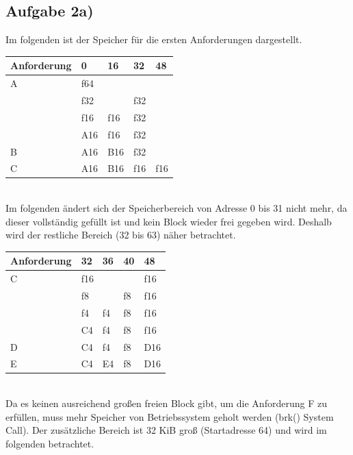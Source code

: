 \documentclass{ti2}
\begin{document}
\subsection*{Aufgabe 2a)}
Im folgenden ist der Speicher für die ersten Anforderungen dargestellt. \\
\begin{table}[htbp]
\begin{adjustbox}{max width=\textwidth}
\begin{tabular}{|l|l|l|l|l|}
\hline
Anforderung & 0 & 16 & 32 & 48 \\ \hline
A  & \multicolumn{ 4}{l|}{f64} \\ \hline
 & \multicolumn{ 2}{l|}{f32} & \multicolumn{ 2}{l|}{f32} \\ \hline
 & f16 & f16 & \multicolumn{ 2}{l|}{f32} \\ \hline
 & A16 & f16 & \multicolumn{ 2}{l|}{f32} \\ \hline
B & A16 & B16 & \multicolumn{ 2}{l|}{f32} \\ \hline
C & A16 & B16 & f16 & f16\\ \hline
\end{tabular}
\end{adjustbox}
\end{table}
\\Im folgenden ändert sich der Speicherbereich von Adresse 0 bis 31 nicht mehr, da dieser vollständig gefüllt ist und kein Block wieder frei gegeben wird. Deshalb wird der restliche Bereich (32 bis 63) näher betrachtet. 
\begin{table}[htbp]
\begin{adjustbox}{max width=\textwidth}
\begin{tabular}{|l|l|l|l|l|}
\hline
Anforderung & 32 & 36 & 40 & 48 \\ \hline
C & \multicolumn{3}{l|}{f16} &f16  \\ \hline
 & \multicolumn{ 2}{l|}{f8} &f8& f16 \\ \hline
 & f4 & f4 &f8 & f16 \\ \hline
 & C4 & f4 & f8 & f16 \\ \hline
D & C4 & f4 & f8 & D16 \\ \hline
E & C4 & E4 & f8 & D16 \\ \hline
\end{tabular}
\end{adjustbox}
\end{table}
\\Da es keinen ausreichend großen freien Block gibt, um die Anforderung F zu erfüllen, muss mehr Speicher von Betriebssystem geholt werden (brk() System Call). Der zusätzliche Bereich ist 32 KiB groß (Startadresse 64) und wird im folgenden betrachtet.
\end{document}
